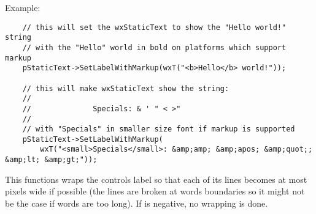 Example:

\begin{verbatim}
    // this will set the wxStaticText to show the "Hello world!" string
    // with the "Hello" world in bold on platforms which support markup
    pStaticText->SetLabelWithMarkup(wxT("<b>Hello</b> world!"));

    // this will make wxStaticText show the string:
    //
    //              Specials: & ' " < >"
    //
    // with "Specials" in smaller size font if markup is supported
    pStaticText->SetLabelWithMarkup(
        wxT("<small>Specials</small>: &amp;amp; &amp;apos; &amp;quot;; &amp;lt; &amp;gt;"));
\end{verbatim}





\label{wxstatictextwrap}


This functions wraps the controls label so that each of its lines becomes at
most  pixels wide if possible (the lines are broken at words
boundaries so it might not be the case if words are too long). If 
is negative, no wrapping is done.


